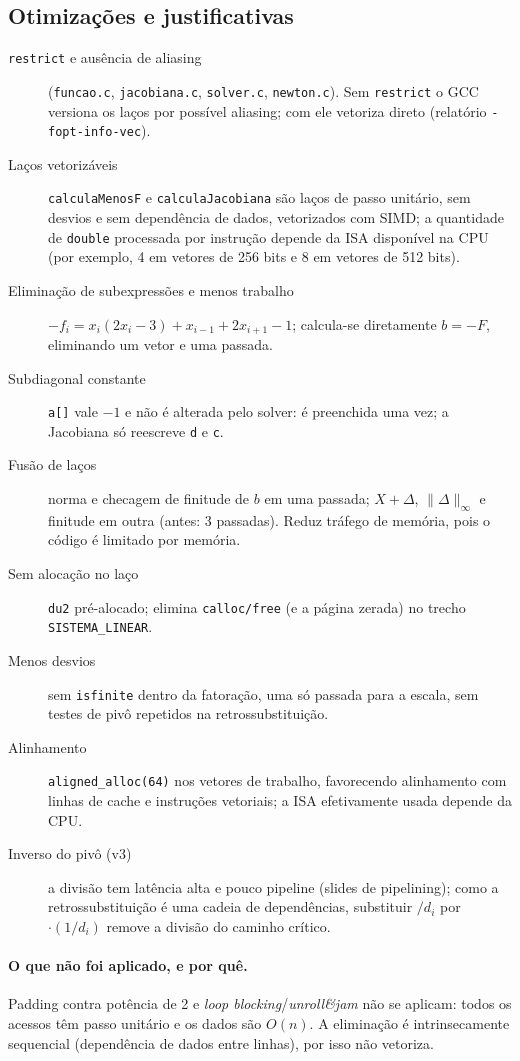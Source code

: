 \documentclass[10pt,a4paper]{article}
\begin{document}
\subsection{Otimizações e justificativas}
\begin{description}
\item[\texttt{restrict} e ausência de aliasing] (\texttt{funcao.c}, \texttt{jacobiana.c}, \texttt{solver.c}, \texttt{newton.c}).
Sem \texttt{restrict} o GCC versiona os laços por possível aliasing; com ele vetoriza direto (relatório \texttt{-fopt-info-vec}).
\item[Laços vetorizáveis] \texttt{calculaMenosF} e \texttt{calculaJacobiana} são laços de passo unitário, sem desvios e sem
dependência de dados, vetorizados com SIMD; a quantidade de \texttt{double} processada por instrução depende da ISA disponível na CPU (por exemplo, 4 em vetores de 256 bits e 8 em vetores de 512 bits).
\item[Eliminação de subexpressões e menos trabalho] $-f_i=x_i(2x_i-3)+x_{i-1}+2x_{i+1}-1$; calcula-se diretamente $b=-F$, eliminando um vetor e uma passada.
\item[Subdiagonal constante] \texttt{a[]} vale $-1$ e não é alterada pelo solver: é preenchida uma vez; a Jacobiana só reescreve \texttt{d} e \texttt{c}.
\item[Fusão de laços] norma e checagem de finitude de $b$ em uma passada; $X+\Delta$, $\|\Delta\|_\infty$ e finitude em outra (antes: 3 passadas). Reduz tráfego de memória, pois o código é limitado por memória.
\item[Sem alocação no laço] \texttt{du2} pré-alocado; elimina \texttt{calloc/free} (e a página zerada) no trecho \texttt{SISTEMA\_LINEAR}.
\item[Menos desvios] sem \texttt{isfinite} dentro da fatoração, uma só passada para a escala, sem testes de pivô repetidos na retrossubstituição.
\item[Alinhamento] \texttt{aligned\_alloc(64)} nos vetores de trabalho, favorecendo alinhamento com linhas de cache e instruções vetoriais; a ISA efetivamente usada depende da CPU.
\item[Inverso do pivô (v3)] a divisão tem latência alta e pouco pipeline (slides de pipelining); como a retrossubstituição é uma cadeia de dependências, substituir $/d_i$ por $\cdot(1/d_i)$ remove a divisão do caminho crítico.
\end{description}
\paragraph{O que não foi aplicado, e por quê.} Padding contra potência de 2 e \emph{loop blocking}/\emph{unroll\&jam}
não se aplicam: todos os acessos têm passo unitário e os dados são $O(n)$. A eliminação é intrinsecamente sequencial
(dependência de dados entre linhas), por isso não vetoriza.
\end{document}
